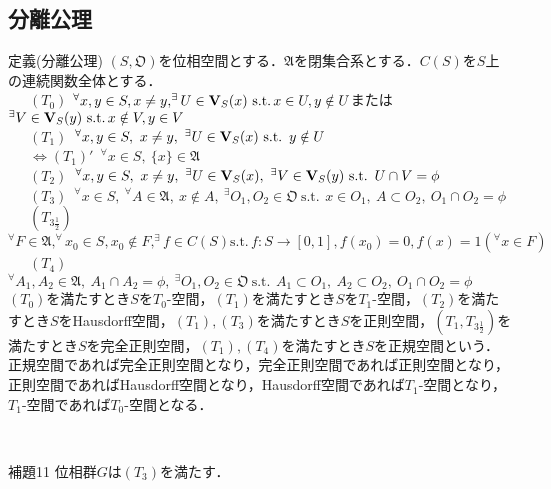 \documentclass[a4paper,11pt]{jsarticle}
\newcommand{\st}{\mathrm{s.t.}\,}  %
\begin{document}
\subsection{分離公理}
\begin{itembox}[l]{定義(分離公理)}
$(S,\mathfrak{O})$を位相空間とする．$\mathfrak{A}$を閉集合系とする．$C(S)$を$S$上の連続関数全体とする．\\
{\ }{\ }{\ }$(T_0)$ $^\forall x,y\in S,x\neq y, ^\exists U\in{\bf V}_S(x){\ }\st x\in U, y\notin U$または$^\exists V\in{\bf V}_S(y){\ }\st x\notin V, y\in V$ \\
{\ }{\ }{\ }$(T_1)${\ }$^\forall x,y\in S,{\ }x\neq y,{\ } ^\exists U\in{\bf V}_S(x){\ }\st{\ }y\notin U$ \\
{\ }{\ }{\ }$\Longleftrightarrow (T_1)'${\ }$^\forall x\in S,{\ }\{x\}\in\mathfrak{A}$ \\
{\ }{\ }{\ }$(T_2)${\ }$^\forall x,y\in S,{\ }x\neq y,{\ } ^\exists U\in{\bf V}_S(x),{\ } ^\exists V\in{\bf V}_S(y){\ }\st{\ }U\cap V=\phi$ \\
{\ }{\ }{\ }$(T_3)${\ }$^\forall x\in S,{\ } ^\forall A\in\mathfrak{A},{\ }x\notin A,{\ } ^\exists O_1,O_2\in\mathfrak{O}{\ }\st{\ }x\in O_1,{\ }A\subset O_2,{\ }O_1\cap O_2=\phi$ \\
{\ }{\ }{\ }$(T_{3\frac{1}{2}})$ $^\forall F\in\mathfrak{A}, ^\forall x_0\in S, x_0\notin F, ^\exists f\in C(S) \st f:S\rightarrow [0,1], f(x_0)=0, f(x)=1 ( ^\forall x\in F)$ \\
{\ }{\ }{\ }$(T_4)${\ }$^\forall A_1,A_2\in\mathfrak{A},{\ }A_1\cap A_2=\phi,{\ } ^\exists O_1,O_2\in\mathfrak{O}{\ }\st{\ }A_1\subset O_1,{\ }A_2\subset O_2,{\ }O_1\cap O_2=\phi$ \\
$(T_0)$を満たすとき$S$を$T_0$-空間，$(T_1)$を満たすとき$S$を$T_1$-空間，$(T_2)$を満たすとき$S$をHausdorff空間，$(T_1),(T_3)$を満たすとき$S$を正則空間，$(T_1,T_{3\frac{1}{2}})$を満たすとき$S$を完全正則空間，$(T_1),(T_4)$を満たすとき$S$を正規空間という．正規空間であれば完全正則空間となり，完全正則空間であれば正則空間となり，正則空間であればHausdorff空間となり，Hausdorff空間であれば$T_1$-空間となり，$T_1$-空間であれば$T_0$-空間となる．
\end{itembox}\\
%
%
%
\begin{itembox}[l]{補題11}
位相群$G$は$(T_3)$を満たす．
\end{itembox}
\vspace{-0.7zh}%
\vspace{-0.7zh}%
\end{document}

